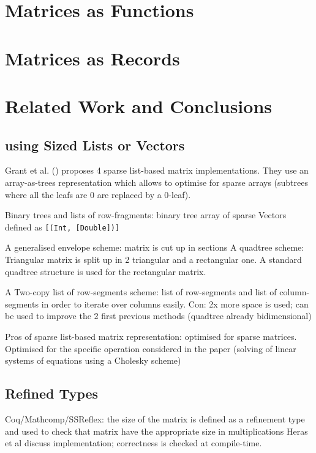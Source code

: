 \documentclass[runningheads]{llncs}
\begin{document}
\section{Matrices as Functions}

\section{Matrices as Records}


\section{Related Work and Conclusions}
\subsection{using Sized Lists or Vectors}

Grant et al. (\cite{grant_sparse_1996}) proposes 4 sparse list-based matrix implementations. They use an array-as-trees representation which allows to optimise for sparse arrays (subtrees where all the leafs are 0 are replaced by a 0-leaf).

Binary trees and lists of row-fragments: binary tree array of sparse Vectors defined as \lstinline{[(Int, [Double])]}

A generalised envelope scheme: matrix is cut up in sections
A quadtree scheme: Triangular matrix is split up in 2 triangular and a rectangular one. 
A standard quadtree structure is used for the rectangular matrix.

A Two-copy list of row-segments scheme: list of row-segments and list of column-segments in order to iterate over columns easily. Con: 2x more space is used; can be used to improve the 2 first previous methods (quadtree already bidimensional)

Pros of sparse list-based matrix representation: optimised for sparse matrices. Optimised for the specific operation considered in the paper (solving of linear systems of equations using a Cholesky scheme)



\subsection{Refined Types}
%
Coq/Mathcomp/SSReflex: the size of the matrix is defined as a refinement type and used to check that matrix have the appropriate size in multiplications
Heras et al \cite{heras_incidence_2011} discuss implementation; correctness is checked at compile-time.
\end{document}

